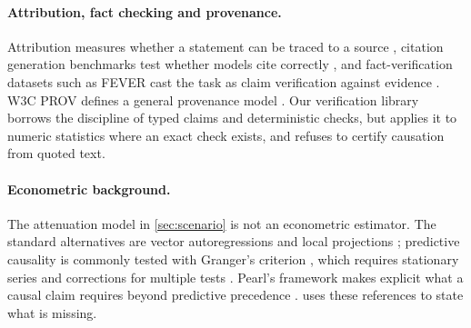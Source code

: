 \documentclass[conference]{IEEEtran}
\begin{document}
\paragraph{Attribution, fact checking and provenance.}
Attribution measures whether a statement can be traced to a source \cite{rashkin2023ais}, citation generation benchmarks test whether models cite correctly \cite{gao2023alce}, and fact-verification datasets such as FEVER cast the task as claim verification against evidence \cite{thorne2018fever}. W3C PROV defines a general provenance model \cite{belhajjame2013prov}. Our verification library borrows the discipline of typed claims and deterministic checks, but applies it to numeric statistics where an exact check exists, and refuses to certify causation from quoted text.

\paragraph{Econometric background.}
The attenuation model in \cref{sec:scenario} is not an econometric estimator. The standard alternatives are vector autoregressions \cite{sims1980macro} and local projections \cite{jorda2005lp}; predictive causality is commonly tested with Granger's criterion \cite{granger1969}, which requires stationary series \cite{dickey1979,kpss1992} and corrections for multiple tests \cite{bh1995}. Pearl's framework makes explicit what a causal claim requires beyond predictive precedence \cite{pearl2009}.  uses these references to state what is missing.
\end{document}
